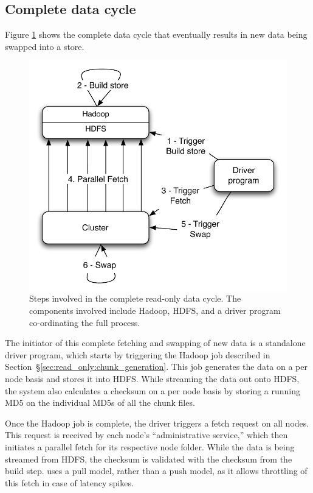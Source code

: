 
\subsection{Complete data cycle}
\label{sec:read_only:data_cycle}

Figure \ref{cycle} shows the complete data cycle that eventually
results in new data being swapped into a \projectname{} store. 

\begin{figure}
  \centering
    \includegraphics[scale=0.60]{images/cycle.pdf}
  \caption{Steps involved in the complete read-only data cycle. The components involved include Hadoop, HDFS, \projectname{} and a driver program co-ordinating the full process.}
  \label{cycle}
\end{figure}

The initiator of this complete fetching and swapping of new data is a
standalone driver program, which starts by triggering the Hadoop job
described in Section~\S\ref{sec:read_only:chunk_generation}. This job
generates the data on a per node basis and stores it into HDFS. While
streaming the data out onto HDFS, the system also calculates a
checksum on a per node basis by storing a running MD5 on the
individual MD5s of all the chunk files. 

Once the Hadoop job is complete, the driver triggers a fetch request
on all \projectname{} nodes. This request is received by each node's
``administrative service,'' which then initiates a parallel fetch for
its respective node folder. While the data is being streamed from
HDFS, the checksum is validated with the checksum from the build step.
\projectname{} uses a pull model, rather than a push model, as it allows
throttling of this fetch in case of latency spikes.

